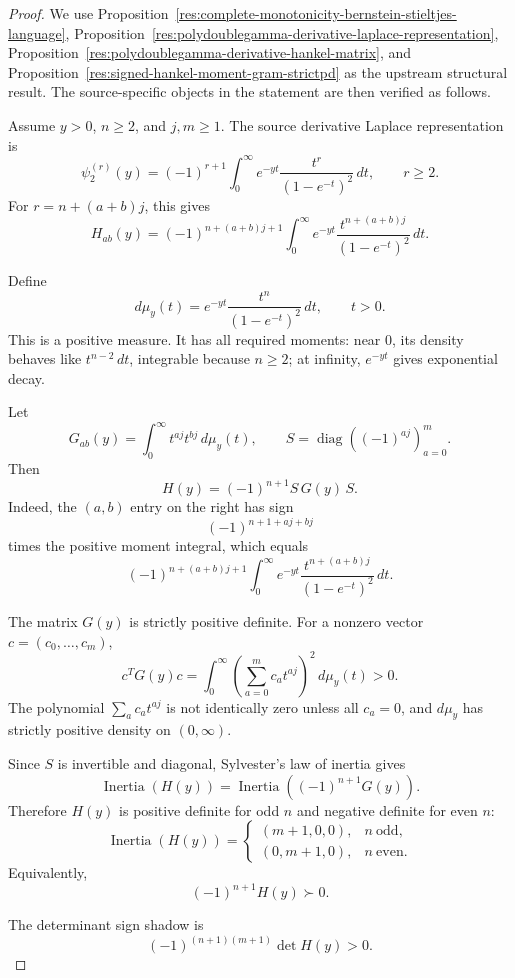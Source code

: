 \documentclass[11pt]{article}
\numberwithin{equation}{section}
\theoremstyle{definition}
\theoremstyle{remark}
\newcommand{\1}{\mathbf 1}
\begin{document}
\begin{proof}
We use Proposition~\ref{res:complete-monotonicity-bernstein-stieltjes-language}, Proposition~\ref{res:polydoublegamma-derivative-laplace-representation}, Proposition~\ref{res:polydoublegamma-derivative-hankel-matrix}, and Proposition~\ref{res:signed-hankel-moment-gram-strictpd} as the upstream structural result. The source-specific objects in the statement are then verified as follows.

Assume \(y>0\), \(n\ge2\), and \(j,m\ge1\). The source derivative Laplace representation is
\[
\psi_2^{(r)}(y)=(-1)^{r+1}\int_0^\infty e^{-yt}\frac{t^r}{(1-e^{-t})^2}\,dt,
\qquad r\ge2.
\]
For \(r=n+(a+b)j\), this gives
\[
H_{ab}(y)=(-1)^{n+(a+b)j+1}
\int_0^\infty e^{-yt}\frac{t^{n+(a+b)j}}{(1-e^{-t})^2}\,dt.
\]

Define
\[
d\mu_y(t)=e^{-yt}\frac{t^n}{(1-e^{-t})^2}\,dt,\qquad t>0.
\]
This is a positive measure. It has all required moments: near \(0\), its density behaves like \(t^{n-2}\,dt\), integrable because \(n\ge2\); at infinity, \(e^{-yt}\) gives exponential decay.

Let
\[
G_{ab}(y)=\int_0^\infty t^{aj}t^{bj}\,d\mu_y(t),
\qquad
S=\operatorname{diag}((-1)^{aj})_{a=0}^{m}.
\]
Then
\[
H(y)=(-1)^{n+1}S\,G(y)\,S.
\]
Indeed, the \((a,b)\) entry on the right has sign
\[
(-1)^{n+1+aj+bj}
\]
times the positive moment integral, which equals
\[
(-1)^{n+(a+b)j+1}
\int_0^\infty e^{-yt}\frac{t^{n+(a+b)j}}{(1-e^{-t})^2}\,dt.
\]

The matrix \(G(y)\) is strictly positive definite. For a nonzero vector \(c=(c_0,\ldots,c_m)\),
\[
c^T G(y)c
=\int_0^\infty \left(\sum_{a=0}^m c_a t^{aj}\right)^2\,d\mu_y(t)>0.
\]
The polynomial \(\sum_a c_a t^{aj}\) is not identically zero unless all \(c_a=0\), and \(d\mu_y\) has strictly positive density on \((0,\infty)\).

Since \(S\) is invertible and diagonal, Sylvester's law of inertia gives
\[
\operatorname{Inertia}(H(y))=\operatorname{Inertia}((-1)^{n+1}G(y)).
\]
Therefore \(H(y)\) is positive definite for odd \(n\) and negative definite for even \(n\):
\[
\operatorname{Inertia}(H(y))=
\begin{cases}
(m+1,0,0),& n\ \text{odd},\\
(0,m+1,0),& n\ \text{even}.
\end{cases}
\]
Equivalently,
\[
(-1)^{n+1}H(y)\succ0.
\]

The determinant sign shadow is
\[
(-1)^{(n+1)(m+1)}\det H(y)>0.
\]
\end{proof}
\end{document}
